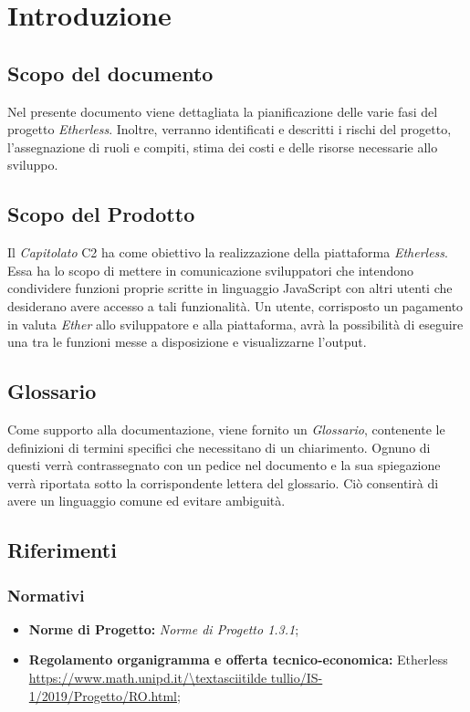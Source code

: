 \section{Introduzione}
\subsection{Scopo del documento}
Nel presente documento viene dettagliata la pianificazione delle varie fasi del progetto \textit{Etherless}. Inoltre, verranno identificati e descritti i rischi del progetto, l'assegnazione di ruoli e compiti, stima dei costi e delle risorse necessarie allo sviluppo.
\subsection{Scopo del Prodotto}
Il \textit{Capitolato\glo} C2 ha come obiettivo la realizzazione della piattaforma \textit{Etherless}. Essa ha lo scopo di mettere in comunicazione sviluppatori che intendono condividere funzioni proprie scritte in linguaggio JavaScript con altri utenti che desiderano avere accesso a tali funzionalità. Un utente, corrisposto un pagamento in valuta \textit{Ether\glos} allo sviluppatore e alla piattaforma, avrà la possibilità di eseguire una tra le funzioni messe a disposizione e visualizzarne l'output. 

\subsection{Glossario}
Come supporto alla documentazione, viene fornito un \textit{Glossario}\docs,
contenente le definizioni di termini specifici che necessitano di un chiarimento.
Ognuno di questi verr\`a contrassegnato con un pedice \glo nel documento e la sua
spiegazione verr\`a riportata sotto la corrispondente lettera del glossario. Ci\`o
consentir\`a di avere un linguaggio comune ed evitare ambiguit\`a.
\subsection{Riferimenti}
\subsubsection{Normativi}
	\begin{itemize}
		\item \textbf{Norme di Progetto:} \textit{Norme di Progetto 1.3.1}\docs;
		\item \textbf{Regolamento organigramma e offerta tecnico-economica:} Etherless\\ 
			\url{https://www.math.unipd.it/\textasciitilde tullio/IS-1/2019/Progetto/RO.html};
	\end{itemize}
